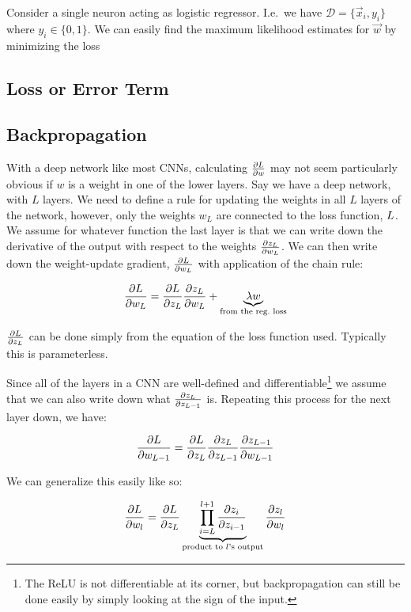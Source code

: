 Consider a single neuron acting as logistic regressor. I.e.\ we have 
$\mathcal{D} = \{\vec{x}_i, y_i\}$ where $y_i \in \{0, 1\}$. 
We can easily find the maximum likelihood estimates for $\vec{w}$ by minimizing
the loss

\subsection{Loss or Error Term}

\subsection{Backpropagation}

With a deep network like most CNNs, calculating $\frac{\partial L}{\partial w}$ may not seem
particularly obvious if $w$ is a weight in one of the lower layers.  Say we have
a deep network, with $L$ layers. We need to define a rule for updating the
weights in all $L$ layers of the network, however, only the weights $w_L$ are
connected to the loss function, $L$. We assume for whatever function the
last layer is that we can write down the derivative of the output with respect
to the weights $\frac{\partial z_{L}}{\partial w_{L}}$. We can then write down the weight-update
gradient, $\frac{\partial L}{\partial w_L}$ with application of the chain rule:

\begin{equation}
  \frac{\partial L}{\partial w_L} = \frac{\partial L}{\partial z_L} \frac{\partial z_L}{\partial w_L} + \underbrace{\lambda
  w}_{\text{from the reg.\ loss}}
\end{equation}

$\frac{\partial L}{\partial z_L}$ can be done simply from the equation of the loss function
used. Typically this is parameterless.

Since all of the layers in a CNN are well-defined and
differentiable\footnote{The ReLU is not differentiable at its corner, but
backpropagation can still be done easily by simply looking at the sign of the
input.} we assume that we can also write down what $\frac{\partial z_L}{\partial z_{L-1}}$ is.
Repeating this process for the next layer down, we have:

\begin{equation}
  \frac{\partial L}{\partial w_{L-1}}
  = \frac{\partial L}{\partial z_L}\frac{\partial z_L}{\partial z_{L-1}}\frac{\partial z_{L-1}}{\partial w_{L-1}}
\end{equation}

We can generalize this easily like so:

\begin{equation}
  \frac{\partial L}{\partial w_{l}}
  = \frac{\partial L}{\partial z_L} \underbrace{\prod_{i=L}^{l+1}
  \frac{\partial z_i}{\partial z_{i-1}}}_{\text{product to $l$'s output}} 
  \frac{\partial z_{l}}{\partial w_{l}}
\end{equation}

